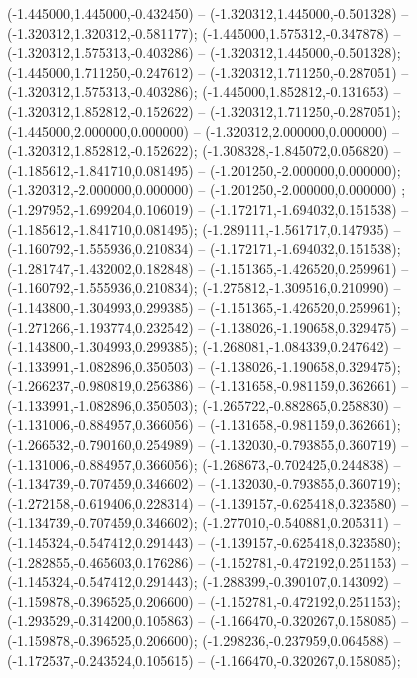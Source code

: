  (-1.445000,1.445000,-0.432450) -- (-1.320312,1.445000,-0.501328) -- (-1.320312,1.320312,-0.581177);
 (-1.445000,1.575312,-0.347878) -- (-1.320312,1.575313,-0.403286) -- (-1.320312,1.445000,-0.501328);
 (-1.445000,1.711250,-0.247612) -- (-1.320312,1.711250,-0.287051) -- (-1.320312,1.575313,-0.403286);
 (-1.445000,1.852812,-0.131653) -- (-1.320312,1.852812,-0.152622) -- (-1.320312,1.711250,-0.287051);
 (-1.445000,2.000000,0.000000) -- (-1.320312,2.000000,0.000000) -- (-1.320312,1.852812,-0.152622);
 (-1.308328,-1.845072,0.056820) -- (-1.185612,-1.841710,0.081495) -- (-1.201250,-2.000000,0.000000);
 (-1.320312,-2.000000,0.000000) -- (-1.201250,-2.000000,0.000000) ;
 (-1.297952,-1.699204,0.106019) -- (-1.172171,-1.694032,0.151538) -- (-1.185612,-1.841710,0.081495);
 (-1.289111,-1.561717,0.147935) -- (-1.160792,-1.555936,0.210834) -- (-1.172171,-1.694032,0.151538);
 (-1.281747,-1.432002,0.182848) -- (-1.151365,-1.426520,0.259961) -- (-1.160792,-1.555936,0.210834);
 (-1.275812,-1.309516,0.210990) -- (-1.143800,-1.304993,0.299385) -- (-1.151365,-1.426520,0.259961);
 (-1.271266,-1.193774,0.232542) -- (-1.138026,-1.190658,0.329475) -- (-1.143800,-1.304993,0.299385);
 (-1.268081,-1.084339,0.247642) -- (-1.133991,-1.082896,0.350503) -- (-1.138026,-1.190658,0.329475);
 (-1.266237,-0.980819,0.256386) -- (-1.131658,-0.981159,0.362661) -- (-1.133991,-1.082896,0.350503);
 (-1.265722,-0.882865,0.258830) -- (-1.131006,-0.884957,0.366056) -- (-1.131658,-0.981159,0.362661);
 (-1.266532,-0.790160,0.254989) -- (-1.132030,-0.793855,0.360719) -- (-1.131006,-0.884957,0.366056);
 (-1.268673,-0.702425,0.244838) -- (-1.134739,-0.707459,0.346602) -- (-1.132030,-0.793855,0.360719);
 (-1.272158,-0.619406,0.228314) -- (-1.139157,-0.625418,0.323580) -- (-1.134739,-0.707459,0.346602);
 (-1.277010,-0.540881,0.205311) -- (-1.145324,-0.547412,0.291443) -- (-1.139157,-0.625418,0.323580);
 (-1.282855,-0.465603,0.176286) -- (-1.152781,-0.472192,0.251153) -- (-1.145324,-0.547412,0.291443);
 (-1.288399,-0.390107,0.143092) -- (-1.159878,-0.396525,0.206600) -- (-1.152781,-0.472192,0.251153);
 (-1.293529,-0.314200,0.105863) -- (-1.166470,-0.320267,0.158085) -- (-1.159878,-0.396525,0.206600);
 (-1.298236,-0.237959,0.064588) -- (-1.172537,-0.243524,0.105615) -- (-1.166470,-0.320267,0.158085);
